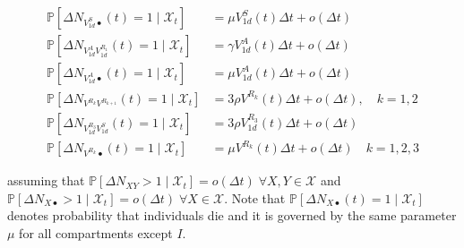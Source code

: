 \begin{fullwidth}
\begin{align}
    \mathbb{P}\left[ \Delta N_{V_{1d}^S\bullet}(t) = 1 \mid\mathcal{X}_t\right] &= \mu  V_{1d}^S(t) \Delta t + o(\Delta t)\\
    \mathbb{P}\left[ \Delta N_{V_{1d}^AV_{1d}^{R_1}}(t) = 1 \mid\mathcal{X}_t\right] &= \gamma V_{1d}^A(t) \Delta t + o(\Delta t)\\
    \mathbb{P}\left[ \Delta N_{V_{1d}^A\bullet}(t) = 1 \mid\mathcal{X}_t\right] &= \mu  V_{1d}^A(t) \Delta t + o(\Delta t)\\
    \mathbb{P}\left[ \Delta N_{V^{R_k}V^{R_{k+1}}}(t) = 1 \mid\mathcal{X}_t\right] &= 3\rho V^{R_k}(t) \Delta t + o(\Delta t),\quad k=1,2\\
    \mathbb{P}\left[ \Delta N_{V_{1d}^{R_3}V_{1d}^S}(t) = 1 \mid\mathcal{X}_t\right] &= 3\rho V_{1d}^{R_3}(t) \Delta t + o(\Delta t)\\
    \mathbb{P}\left[ \Delta N_{V^{R_k}\bullet}(t) = 1 \mid\mathcal{X}_t\right] &= \mu  V^{R_k}(t) \Delta t + o(\Delta t)\quad k=1,2,3
\end{align}
\endgroup
\end{fullwidth}
assuming that \(\mathbb{P}[\Delta N_{XY} > 1\mid\mathcal{X}_t] = o(\Delta t) \; \forall X,Y \in \mathcal{X}\) and \(\mathbb{P}[\Delta N_{X\bullet} > 1\mid\mathcal{X}_t] = o(\Delta t) \; \forall X \in \mathcal{X}\). Note that \(\mathbb{P}\left[ \Delta N_{X\bullet}(t) = 1 \mid\mathcal{X}_t\right]\) denotes probability that individuals die and it is governed by the same parameter $\mu$ for all compartments except $I$. 

